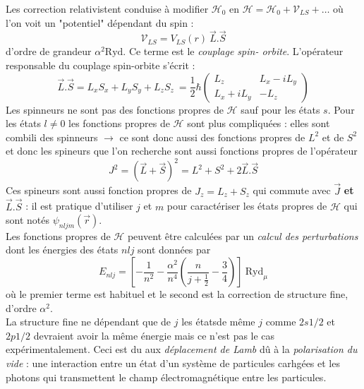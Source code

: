 \documentclass	[11pt, a4paper, openany]{book}
\begin{document}
	Les correction relativistent conduise à modifier $\mathcal{H}_0$ en $\mathcal{H} = 
	\mathcal{H}_0 + \mathcal{V}_{LS} + \dots$ où l'on voit un "potentiel" dépendant du 
	spin :
	\begin{equation}
	\mathcal{V}_{LS} = V_{LS}(r)\ \vec{L}.\vec{S}
	\end{equation}
	d'ordre de grandeur $\alpha^2\text{Ryd}$. Ce terme est le \textit{couplage spin-
	orbite}. L'opérateur responsable du couplage spin-orbite s'écrit : 
	\begin{equation}
	\vec{L}.\vec{S} = L_xS_x + L_yS_y + L_zS_z\ = \frac{1}{2}\hbar\left(\begin{array}{cc}
	 L_z & L_x-iL_y\\
	 L_x+iL_y & -L_z
	 \end{array}\right)
	\end{equation}
	Les spinneurs ne sont pas des fonctions propres de $\mathcal{H}$ sauf pour les états
	$s$. Pour les états $l\neq 0$ les fonctions propres de $\mathcal{H}$ sont plus 
	compliquées : elles sont combili des spinneurs $\rightarrow$ ce sont donc aussi des
	fonctions propres de $L^2$ et de $S^2$ et donc les spineurs que l'on recherche sont 
	aussi fonctions propres de l'opérateur 
	\begin{equation}
	J^2 = (\vec{L}+\vec{S})^2 = L^2 + S^2 + 2\vec{L}.\vec{S}
	\end{equation}
	Ces spineurs sont aussi fonction propres de $J_z = L_z+S_z$ qui commute avec $\vec{
	J}$ \textbf{et} $\vec{L}.\vec{S}$ : il est pratique d'utiliser $j$ et $m$ pour 
	caractériser les états propres de $\mathcal{H}$ qui sont notés $\psi_{nljm}(\vec{r})$.\\
	
	Les fonctions propres de $\mathcal{H}$ peuvent être calculées par un \textit{calcul 
	des perturbations} dont les énergies des états $nlj$ sont données par 
	\begin{equation}
	E_{nlj} = \left[-\frac{1}{n^2} - \frac{\alpha^2}{n^4}\left(\frac{n}{j+\frac{1}{2}}-
	\frac{3}{4}\right)\right]\ \text{Ryd}_\mu
	\end{equation}
	où le premier terme est habituel et le second est la correction de structure fine, 
	d'ordre $\alpha^2$.\\
	La structure fine ne dépendant que de $j$ les étatsde m\^eme $j$ comme $2s1/2$ et $2p1/2$ 
	devraient avoir	la m\^eme énergie mais ce n'est pas le cas expérimentalement. Ceci 
	est du aux \textit{déplacement de Lamb} d\^u à la \textit{polarisation du vide} :
	une interaction entre un état d'un système de particules carhgées et les photons qui 
	transmettent le champ électromagnétique entre les particules.
	
\end{document}
